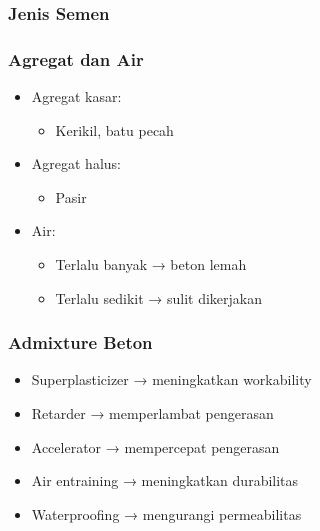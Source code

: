 \documentclass[../main.tex]{subfiles}
\begin{document}
\begin{frame}[mytitle=standard,t,mybg=bglight3,light]\frametitle{Jenis Semen}


\end{frame}

\begin{frame}[mytitle=standard,t,mycolor=digiPH_gray,light]\frametitle{Agregat dan Air}
	\begin{itemize}
		\item Agregat kasar:
		      \begin{itemize}
			      \item Kerikil, batu pecah
		      \end{itemize}
		\item Agregat halus:
		      \begin{itemize}
			      \item Pasir
		      \end{itemize}
		\item Air:
		      \begin{itemize}
			      \item Terlalu banyak → beton lemah
			      \item Terlalu sedikit → sulit dikerjakan
		      \end{itemize}
	\end{itemize}\end{frame}

\begin{frame}[mytitle=standard,t,mycolor=digiPH_purple,dark]\frametitle{Admixture Beton}
	\begin{itemize}
		\item Superplasticizer → meningkatkan workability
		\item Retarder → memperlambat pengerasan
		\item Accelerator → mempercepat pengerasan
		\item Air entraining → meningkatkan durabilitas
		\item Waterproofing → mengurangi permeabilitas
	\end{itemize}\end{frame}
\end{document}

